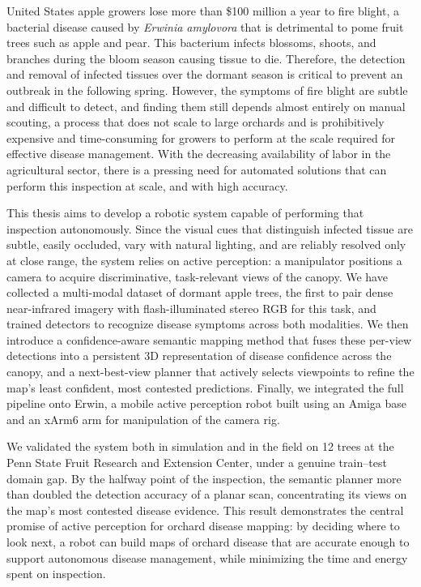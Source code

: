 
\setlength{\parskip}{1em}
\setlength{\parindent}{0em}

\noindent
United States apple growers lose more than \$100 million a year to fire blight,
a bacterial disease caused by \textit{Erwinia amylovora} that is detrimental to
pome fruit trees such as apple and pear. This bacterium infects blossoms, shoots,
and branches during the bloom season causing tissue to die. Therefore, the 
detection and removal of infected tissues over the dormant season is critical 
to prevent an outbreak in the following spring. However, the symptoms of fire 
blight are subtle and difficult to detect, and finding them still depends almost 
entirely on manual scouting, a process that does not scale to large orchards and 
is prohibitively expensive and time-consuming for growers to perform at the 
scale required for effective disease management. With the decreasing availability
of labor in the agricultural sector, there is a pressing need for automated
solutions that can perform this inspection at scale, and with high accuracy.

This thesis aims to develop a robotic system capable of performing that inspection
autonomously. Since the visual cues that distinguish infected tissue are subtle,
easily occluded, vary with natural lighting, and are reliably resolved only
at close range, the system relies on active perception: a manipulator positions
a camera to acquire discriminative, task-relevant views of the canopy.
We have collected a multi-modal dataset of dormant apple trees, the first to pair
dense near-infrared imagery with flash-illuminated stereo RGB for this task, and
trained detectors to recognize disease symptoms across both modalities. We then 
introduce a confidence-aware semantic mapping method that fuses these per-view 
detections into a persistent 3D representation of disease confidence
across the canopy, and a next-best-view planner that actively selects viewpoints 
to refine the map's least confident, most contested predictions. Finally, we 
integrated the full pipeline onto Erwin, a mobile active perception robot built
using an Amiga base and an xArm6 arm for manipulation of the camera rig.

We validated the system both in simulation and in the field on 12 trees at the
Penn State Fruit Research and Extension Center, under a genuine train--test
domain gap. By the halfway point of the inspection, the semantic planner more
than doubled the detection accuracy of a planar scan, concentrating its views on
the map's most contested disease evidence.
This result demonstrates the central promise of active perception for orchard
disease mapping: by deciding where to look next, a robot can build maps of orchard
disease that are accurate enough to support autonomous disease management,
while minimizing the time and energy spent on inspection.
